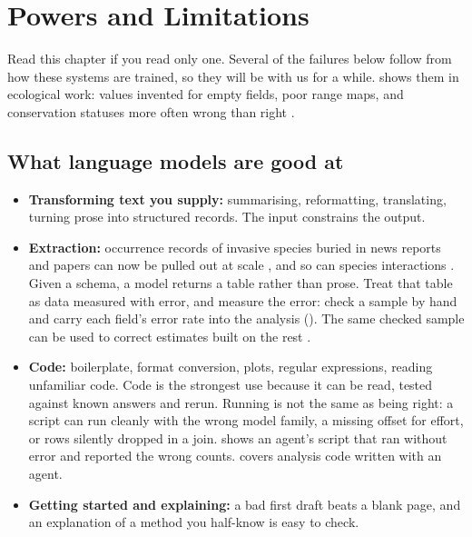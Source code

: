 \chapter{Powers and Limitations}
\label{ch:powers}

Read this chapter if you read only one. Several of the failures below follow
from how these systems are trained, so they will be with us for a while.
 shows them in ecological work: values invented for
empty fields, poor range maps, and conservation statuses more often wrong than
right
\parencite{gougherty2024extraction,dorm2026ecologicalknowledge,uryu2026redlist}.

\section{What language models are good at}

\begin{itemize}
  \item \textbf{Transforming text you supply:} summarising, reformatting,
    translating, turning prose into structured records. The input constrains
    the output.
  \item \textbf{Extraction:} occurrence records of invasive species buried in
    news reports and papers can now be pulled out at scale
    \parencite{castro2024unstructured}, and so can species interactions
    \parencite{keck2026interactions}. Given a schema, a model returns a table
    rather than prose. Treat that table as data measured with error, and
    measure the error: check a sample by hand and carry each field's error
    rate into the analysis (). The same checked sample
    can be used to correct estimates built on the rest
    \parencite{angelopoulos2023ppi,egami2023surrogates}.
  \item \textbf{Code:} boilerplate, format conversion, plots, regular
    expressions, reading unfamiliar code. Code is the strongest use because it
    can be read, tested against known answers and rerun. Running is not the
    same as being right: a script can run cleanly with the wrong model family,
    a missing offset for effort, or rows silently dropped in a join.
     shows an agent's script that ran without error and
    reported the wrong counts.  covers analysis code
    written with an agent.
  \item \textbf{Getting started and explaining:} a bad first draft beats a blank
    page, and an explanation of a method you half-know is easy to check.
\end{itemize}

